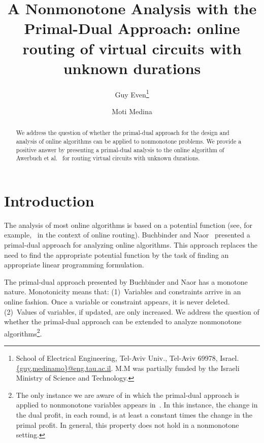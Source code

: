\documentclass[11pt]{article}
\newenvironment{proof sketch}[1]{\noindent {\emph{Proof sketch of #1:}}}{\hfill \qed}
\begin{document}
\title{A Nonmonotone Analysis with the Primal-Dual Approach: online routing of virtual circuits with unknown durations}

\author{Guy Even\thanks{School of Electrical Engineering, Tel-Aviv
Univ., Tel-Aviv 69978, Israel.
\protect\url{{guy,medinamo}@eng.tau.ac.il}.\newline
M.M was partially funded
by the Israeli Ministry of Science and Technology.} \and Moti Medina
}
\date{}
\maketitle

\begin{abstract}
  We address the question of whether the primal-dual approach for the
  design and analysis of online algorithms can be applied to
  nonmonotone problems. We provide a positive answer by presenting a
  primal-dual analysis to the online algorithm of Awerbuch
  et al.~\cite{awerbuch2001competitive} for routing virtual circuits with unknown durations.
\end{abstract}



\section{Introduction}
The analysis of most online algorithms is based on a potential
function (see, for example,~\cite{AAP, azar1997line, aspnes1997line, awerbuch2001competitive} in the context of online routing).
Buchbinder and Naor~\cite{BNsurvey} presented a primal-dual approach for
analyzing online algorithms.  This approach replaces the need to find
the appropriate potential function by the task of finding an
appropriate linear programming formulation.

The primal-dual approach presented by Buchbinder and Naor has a
monotone nature.  Monotonicity means that: (1)~Variables and
constraints arrive in an online fashion. Once a variable or constraint
appears, it is never deleted. (2)~Values of variables, if updated, are
only increased.  We address the question of whether the primal-dual
approach can be extended to analyze nonmonotone
algorithms\footnote{The only instance we are aware of in which the
  primal-dual approach is applied to nonmonotone variables appears
  in~\cite{buchbinder2011frequency}. In this instance, the change in
  the dual profit, in each round, is at least a constant times the change in the
  primal profit. In general, this property does not hold in a nonmonotone setting.}.
\end{document}
